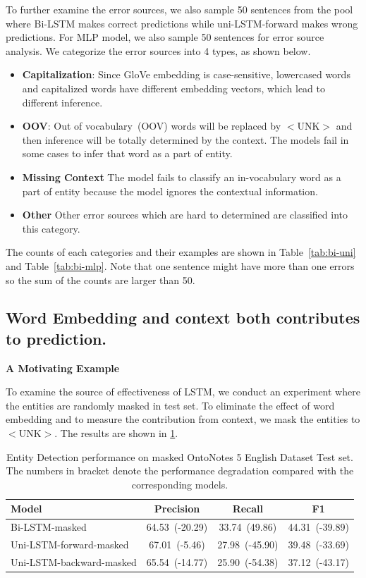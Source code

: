 \documentclass{article}
\begin{document}
To further examine the error sources, we also sample 50 sentences from the pool where Bi-LSTM makes correct predictions while uni-LSTM-forward makes wrong predictions. For MLP model, we also sample 50 sentences for error source analysis. We categorize the error sources into 4 types, as shown below.

\begin{itemize}
	\item \textbf{Capitalization}: Since GloVe embedding is case-sensitive, lowercased words and capitalized words have different embedding vectors, which lead to different inference. 
	\item \textbf{OOV}: Out of vocabulary~(OOV) words will be replaced by $<$UNK$>$ and then inference will be totally determined by the context. The models fail in some cases to infer that word as a part of entity.
	\item \textbf{Missing Context} The model fails to classify an in-vocabulary word as a part of entity because the model ignores the contextual information. 
	\item \textbf{Other} Other error sources which are hard to determined are classified into this category.
\end{itemize}

The counts of each categories and their examples are shown in Table~\ref{tab:bi-uni} and Table~\ref{tab:bi-mlp}. Note that one sentence might have more than one errors so the sum of the counts are larger than 50.

\subsection{Word Embedding and context both contributes to prediction.}

\noindent \textbf{A Motivating Example} 

To examine the source of effectiveness of LSTM, we conduct an experiment where the entities are randomly masked in test set. To eliminate the effect of word embedding and to measure the contribution from context, we mask the entities to $<$UNK$>$. The results are shown in \ref{tab:mask}.

\begin{table}[t]
	\centering
	\begin{tabular}{l@{\qquad}ccc}
		\toprule
		\textbf{Model}		& \textbf{Precision}	& \textbf{Recall}	& \textbf{F1} \\ \midrule
		Bi-LSTM-masked 	& 64.53~(-20.29) 			& 33.74~(49.86)			& 44.31~(-39.89) \\ 
		Uni-LSTM-forward-masked & 67.01~(-5.46) 		& 27.98~(-45.90) 			& 39.48~(-33.69) \\ 
		Uni-LSTM-backward-masked& 65.54~(-14.77) 		& 25.90~(-54.38)			& 37.12~(-43.17) \\ 
		\bottomrule
	\end{tabular}
	\vspace{3mm}
	\caption{Entity Detection performance on masked OntoNotes 5 English Dataset Test set. The numbers in bracket denote the performance degradation compared with the corresponding models.}
	\label{tab:mask}
\end{table}
\end{document}
